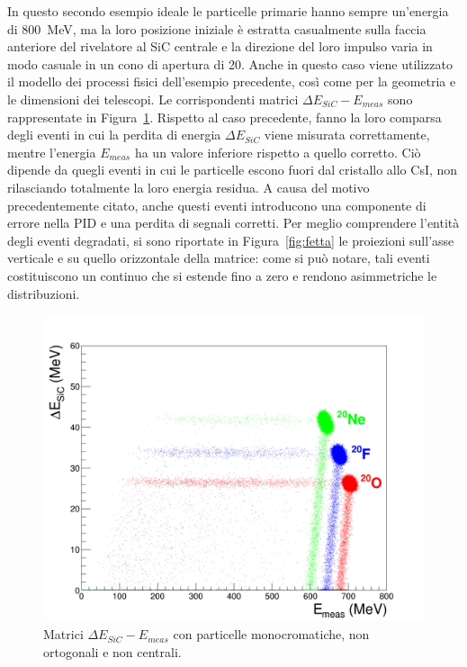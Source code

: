 In questo secondo esempio ideale le particelle primarie hanno sempre un'energia di 800~MeV, ma la loro posizione iniziale è estratta casualmente sulla faccia anteriore del rivelatore al SiC centrale e la direzione del loro impulso varia in modo casuale in un cono di apertura di 20\textdegree{}.
Anche in questo caso viene utilizzato il modello dei processi fisici dell'esempio precedente, così come per la geometria e le dimensioni dei telescopi.
Le corrispondenti matrici $\Delta E_{SiC} - E_{meas}$ sono rappresentate in Figura~\ref{fig:deltaE_ETot_full_energy}.
Rispetto al caso precedente, fanno la loro comparsa degli eventi in cui la perdita di energia $\Delta E_{SiC}$ viene misurata correttamente, mentre l'energia $E_{meas}$ ha un valore inferiore rispetto a quello corretto. 
Ciò dipende da quegli eventi in cui le particelle escono fuori dal cristallo allo CsI, non rilasciando totalmente la loro energia residua.
A causa del motivo precedentemente citato, anche questi eventi introducono una componente di errore nella PID e una perdita di segnali corretti.
Per meglio comprendere l'entità degli eventi degradati, si sono riportate in Figura~\ref{fig:fetta} le proiezioni sull'asse verticale e su quello orizzontale della matrice: come si può notare, tali eventi costituiscono un continuo che si estende fino a zero e rendono asimmetriche le distribuzioni. 
\begin{figure} [!p]
	\centering
	\includegraphics[width=\textwidth, keepaspectratio]{Grafici_Tesi2/Particelle_non_ortogonali/deltaE_ETot_intero_range_quadrata.png}
	\caption{Matrici $\Delta E_{SiC} - E_{meas}$ con particelle monocromatiche, non ortogonali e non centrali.} \label{fig:deltaE_ETot_full_energy}
\end{figure}


